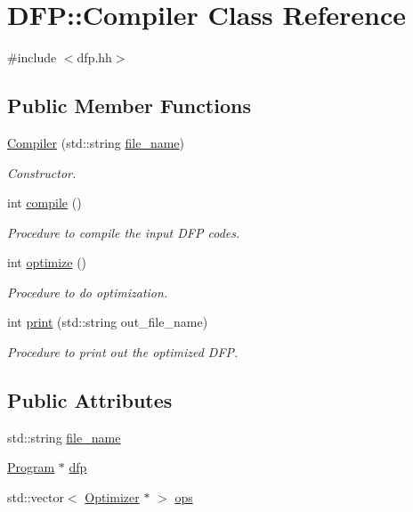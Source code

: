 \hypertarget{class_d_f_p_1_1_compiler}{}\section{D\+FP\+:\+:Compiler Class Reference}
\label{class_d_f_p_1_1_compiler}


{\ttfamily \#include $<$dfp.\+hh$>$}

\subsection*{Public Member Functions}
\begin{DoxyCompactItemize}
\item 
\hyperlink{class_d_f_p_1_1_compiler_a50b7375fef9b5f9f911ba37852195467}{Compiler} (std\+::string \hyperlink{class_d_f_p_1_1_compiler_a1c91460b5beaebb3f657eeb639734f35}{file\+\_\+name})
\begin{DoxyCompactList}\small\item\em Constructor. \end{DoxyCompactList}\item 
int \hyperlink{class_d_f_p_1_1_compiler_a79f611dd27bff14c67741c5d305d95b2}{compile} ()
\begin{DoxyCompactList}\small\item\em Procedure to compile the input D\+FP codes. \end{DoxyCompactList}\item 
int \hyperlink{class_d_f_p_1_1_compiler_aadebebf9f19ef17f4f60c7c147712c9e}{optimize} ()
\begin{DoxyCompactList}\small\item\em Procedure to do optimization. \end{DoxyCompactList}\item 
int \hyperlink{class_d_f_p_1_1_compiler_a42794e01b0341cf94ef42c1d783ba199}{print} (std\+::string out\+\_\+file\+\_\+name)
\begin{DoxyCompactList}\small\item\em Procedure to print out the optimized D\+FP. \end{DoxyCompactList}\end{DoxyCompactItemize}
\subsection*{Public Attributes}
\begin{DoxyCompactItemize}
\item 
std\+::string \hyperlink{class_d_f_p_1_1_compiler_a1c91460b5beaebb3f657eeb639734f35}{file\+\_\+name}
\item 
\hyperlink{class_d_f_p_1_1_program}{Program} $\ast$ \hyperlink{class_d_f_p_1_1_compiler_aba7a515032df6ac78a634d71e7cf41c6}{dfp}
\item 
std\+::vector$<$ \hyperlink{class_d_f_p_1_1_optimizer}{Optimizer} $\ast$ $>$ \hyperlink{class_d_f_p_1_1_compiler_a6f14e4f15a69a0f4c3d2c9327d60c0a5}{ops}
\end{DoxyCompactItemize}


